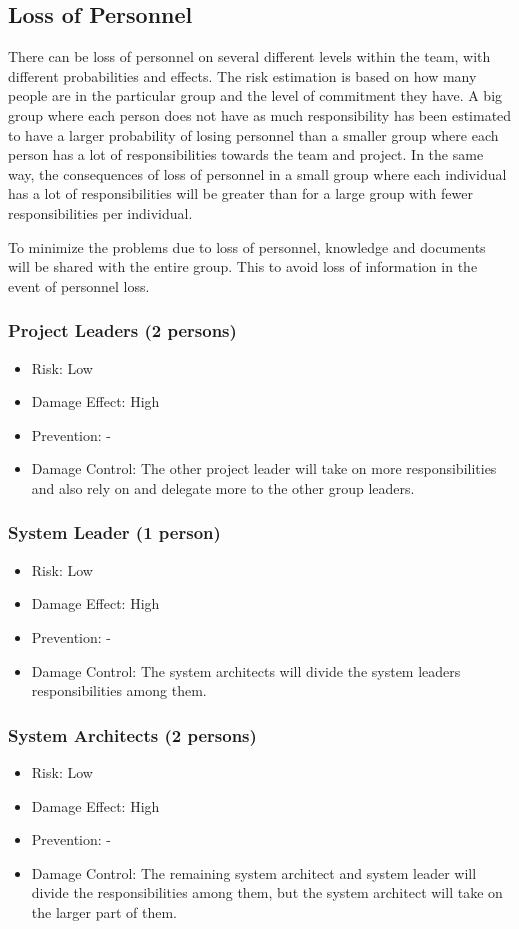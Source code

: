 \documentclass[a4paper]{article}
\begin{document}
\subsection{Loss of Personnel}
There can be loss of personnel on several different levels within the team, with different probabilities and effects. The risk estimation is based on how many people are in the particular group and the level of commitment they have. A big group where each person does not have as much responsibility has been estimated to have a larger probability of losing personnel than a smaller group where each person has a lot of responsibilities towards the team and project. In the same way, the consequences of loss of personnel in a small group where each individual has a lot of responsibilities will be greater than for a large group with fewer responsibilities per individual.

To minimize the problems due to loss of personnel, knowledge and documents will be shared with the entire group. This to avoid loss of information in the event of personnel loss.

\subsubsection{Project Leaders (2 persons)}
\begin{itemize}
\item Risk: Low
\item Damage Effect: High
\item Prevention: -
\item Damage Control: The other project leader will take on more responsibilities and also rely on and delegate more to the other group leaders.
\end{itemize}

\subsubsection{System Leader (1 person)}
\begin{itemize}
\item Risk: Low
\item Damage Effect: High
\item Prevention: -
\item Damage Control: The system architects will divide the system leaders responsibilities among them.
\end{itemize}

\subsubsection{System Architects (2 persons)}
\begin{itemize}
\item Risk: Low
\item Damage Effect: High
\item Prevention: -
\item Damage Control: The remaining system architect and system leader will divide the responsibilities among them, but the system architect will take on the larger part of them.
\end{itemize}
\end{document}
